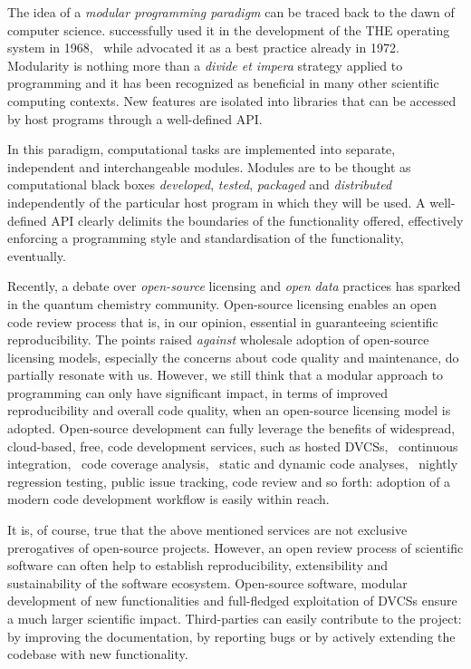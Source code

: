 The idea of a \emph{modular programming paradigm} can be traced back to
the dawn of computer science. \citeauthor{Dijkstra1968-zp}
successfully used it in the development of the THE operating
system in 1968,~\autocite{Dijkstra1968-zp} while
\citeauthor{Parnas1972-im} advocated it as a best practice already in
1972.~\autocite{Parnas1972-im}
Modularity is nothing more than a \emph{divide et impera} strategy
applied to programming and it has been recognized as beneficial in many
other scientific computing contexts.
New features are isolated into libraries that can be accessed by host
programs through a well-defined \gls{API}.

In this paradigm, computational tasks are implemented into separate,
independent and interchangeable modules.
Modules are to be thought as computational black boxes \emph{developed},
\emph{tested}, \emph{packaged} and \emph{distributed} independently of
the particular host program in which they will be used.
A well-defined \gls{API} clearly delimits the boundaries of the functionality
offered, effectively enforcing a programming style and standardisation of the
functionality, eventually.~\autocite{Reddy2011-sd}

Recently, a debate over \emph{open-source}
licensing\autocite{St_Laurent2004-fa} and \emph{open data} practices has
sparked in the quantum chemistry community.\autocite{Gezelter2015-gz, Krylov2015-fs,
Jacob2016-oq}
Open-source licensing enables an open code review process that is, in
our opinion, essential in guaranteeing scientific
reproducibility.\autocite{Gezelter2015-gz}
The points raised \emph{against} wholesale adoption of open-source
licensing models,\autocite{Krylov2015-fs} especially the concerns about
code quality and maintenance, do partially resonate with us.
However, we still think that a modular approach to programming can only
have significant impact, in terms of improved reproducibility and
overall code quality, when an open-source licensing model is adopted.
Open-source development can fully leverage the benefits of widespread,
cloud-based, free, code development services, such as hosted
\acp{DVCS},~\autocite{github, gitlab} continuous
integration,~\autocite{travis-ci, magnum-ci, appveyor-ci} code
coverage analysis,~\autocite{coveralls} static and dynamic code
analyses,~\autocite{coverity-scan} nightly regression testing, public
issue tracking, code review and so forth: adoption of a modern code
development workflow is easily within reach.

It is, of course, true that the above mentioned services are not
exclusive prerogatives of open-source projects. However, an open review
process of scientific software can often help to establish
reproducibility, extensibility and sustainability of the software
ecosystem.
Open-source software, modular development of new functionalities and
full-fledged exploitation of \acsp{DVCS} ensure a much larger scientific
impact. Third-parties can easily contribute to the project: by improving
the documentation, by reporting bugs or by actively extending the
codebase with new functionality.

